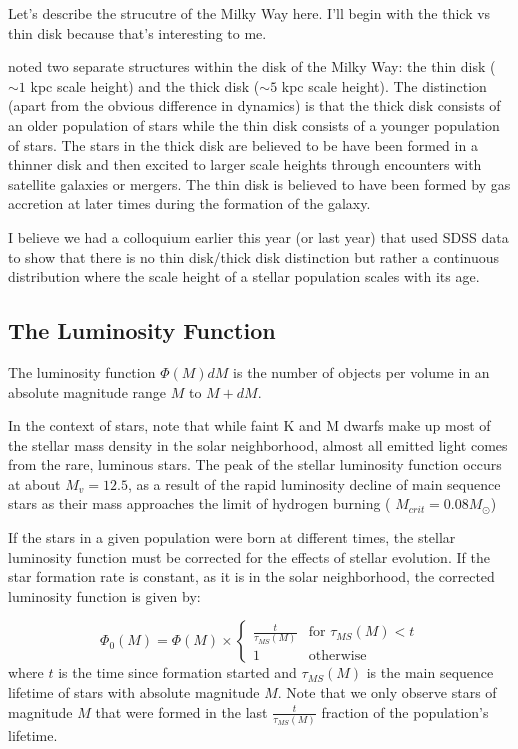 Let's describe the strucutre of the Milky Way here.  I'll begin with the thick vs thin disk
because that's interesting to me.

 noted two separate structures within the disk of the
Milky Way: the thin disk ($\sim1$ kpc scale height) and the thick disk
($\sim5$ kpc scale height).  The distinction (apart from the obvious difference in dynamics)
is that the thick disk consists of an older population of stars while the thin disk consists
of a younger population of stars.
The stars in the thick disk are believed to be have been formed in a thinner disk and then
excited to larger scale heights through encounters with satellite galaxies or mergers.
The thin disk is believed to have been formed by gas
accretion at later times during the formation of the galaxy.

I believe we had a colloquium earlier this year (or last year) that used SDSS data to show
that there is no thin disk/thick disk distinction but rather a continuous distribution
where the scale height of a stellar population scales with its age.

\subsection{The Luminosity Function}

The luminosity function $\Phi(M)dM$ is the number of objects per volume in an absolute magnitude range $M$ to $M+dM$. 

In the context of stars, note that while faint K and M dwarfs make up most of the stellar mass density in the solar neighborhood, almost all emitted light comes from the rare, luminous stars. The peak of the stellar luminosity function occurs at about $M_v = 12.5$, as a result of the rapid luminosity decline of main sequence stars as their mass approaches the limit of hydrogen burning ( $M_{crit} = 0.08 M_\odot$)

If the stars in a given population were born at different times, the stellar luminosity function must be corrected for the effects of stellar evolution. If the star formation rate is constant, as it is in the solar neighborhood,  the corrected luminosity function is given by:

 \begin{equation}
\Phi_0(M) = \Phi(M) \times
\begin{cases}
\frac{t}{\tau_{MS}(M)} & \text{for } \tau_{MS}(M)<t \\
1 & \text{otherwise}
\end{cases}
\end{equation} 
where $t$ is the time since formation started and $\tau_{MS}(M)$ is the main sequence lifetime of stars with absolute magnitude $M$. Note that we only observe stars of magnitude $M$ that were formed in the last $\frac{t}{\tau_{MS}(M)}$ fraction of the population's lifetime.

